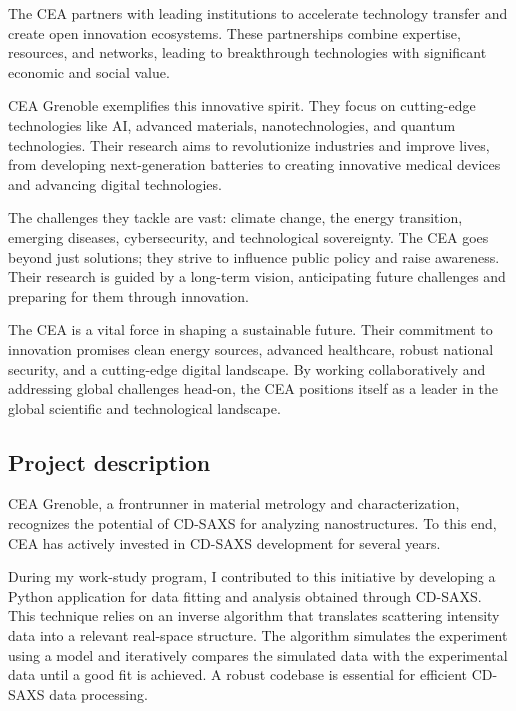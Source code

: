 \medskip

The CEA partners with leading institutions to accelerate technology transfer and create open innovation ecosystems. 
 These partnerships combine expertise, resources, and networks, leading to breakthrough technologies with significant 
 economic and social value.

\medskip

CEA Grenoble exemplifies this innovative spirit. They focus on cutting-edge technologies like AI, advanced materials,
 nanotechnologies, and quantum technologies.  Their research aims to revolutionize industries and improve lives, from
 developing next-generation batteries to creating innovative medical devices and advancing digital technologies.

\medskip

The challenges they tackle are vast: climate change, the energy transition, emerging diseases, cybersecurity, and 
technological sovereignty.  The CEA goes beyond just solutions; they strive to influence public policy and raise awareness. 
 Their research is guided by a long-term vision, anticipating future challenges and preparing for them through innovation.

\medskip

The CEA is a vital force in shaping a sustainable future.  Their commitment to innovation promises clean energy sources, 
advanced healthcare, robust national security, and a cutting-edge digital landscape.  By working collaboratively and addressing
 global challenges head-on, the CEA positions itself as a leader in the global scientific and technological landscape.

\medskip

\subsection{Project description}

\medskip
CEA Grenoble, a frontrunner in material metrology and characterization, recognizes the potential
 of CD-SAXS for analyzing nanostructures. To 
 this end, CEA has actively invested in CD-SAXS development for several years.

\medskip

During my work-study program, I contributed to this initiative by developing a Python application
 for data fitting and analysis obtained through CD-SAXS. This technique relies on an inverse 
 algorithm that translates scattering intensity data into a relevant real-space structure. The 
 algorithm simulates the experiment using a model and iteratively compares the simulated data 
 with the experimental data until a good fit is achieved. A robust codebase is essential for 
 efficient CD-SAXS data processing.

